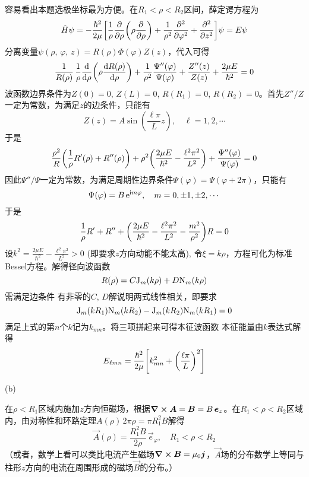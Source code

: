 \begin{enumerate}[label=\textbf{5.\Alph*}, listparindent=\parindent, leftmargin=-0.5mm]
容易看出本题选极坐标最为方便。在$R_1<\rho<R_2$区间，薛定谔方程为
\[\hat{H}\psi = -\frac{\hbar^2}{2\mu}\qty[\frac{1}{\rho}\pdv{\rho}\qty(\rho\pdv{\rho})+\frac{1}{\rho^2}\pdv[2]{\varphi}+\pdv[2]{z}]\psi = E\psi\]
分离变量$\psi(\rho,\,\varphi,\,z)=R(\rho)\Phi(\varphi)Z(z)$，代入可得
\[\frac{1}{R(\rho)}\,\frac{1}{\rho}\dv{\rho}\qty(\rho\dv{R(\rho)}{\rho})+\frac{1}{\rho^2}\frac{\Psi''(\varphi)}{\Psi(\varphi)}+\frac{Z''(z)}{Z(z)} + \frac{2\mu E}{\hbar^2}=0\]
波函数边界条件为$Z(0)=0$, $Z(L)=0$, $R(R_1)=0$, $R(R_2)=0$。首先$Z''/Z$一定为常数，为满足$z$的边条件，只能有
\[Z(z)=A\sin(\frac{\ell \pi}{L}z),\quad \ell=1,2,\cdots\]
于是
\[\frac{\rho^2}{R}\qty(\frac{1}{\rho} R'(\rho)+R''(\rho))+\rho^2\qty(\frac{2\mu E}{\hbar^2}-\frac{\ell^2 \pi^2}{L^2})+\frac{\Psi''(\varphi)}{\Psi(\varphi)}=0\]
因此$\Psi''/\Psi$一定为常数，为满足周期性边界条件$\Psi(\varphi)=\Psi(\varphi+2\pi)$，只能有
\[\Psi(\varphi)=B\,\mathrm{e}^{\mathrm{i} m\varphi},\quad m=0,\pm1,\pm2,\cdots\]
于是
\begin{equation}\label{eq:1}
    \frac{1}{\rho}R'+R''+\qty(\frac{2\mu E}{\hbar^2}-\frac{\ell^2\pi^2}{L^2}-\frac{m^2}{\rho^2})R=0
\end{equation}
设$k^2 = \frac{2\mu E}{\hbar^2}-\frac{\ell^2\pi^2}{L^2}>0$ (即要求$z$方向动能不能太高), 令$\xi =k\rho$，方程可化为标准Bessel方程。解得径向波函数
\[R(\rho)=C\mathrm{J}_m(k\rho) + D\mathrm{N}_m(k\rho)\]
需满足边条件
有非零的$C,\,D$解说明两式线性相关，即要求
\[\mathrm{J}_m(kR_1)\mathrm{N}_m(kR_2)-\mathrm{J}_m(kR_2)\mathrm{N}_m(kR_1)=0\]
满足上式的第$n$个$k$记为$k_{mn}$。将三项拼起来可得本征波函数
本征能量由$k$表达式解得
\[E_{\ell mn} =\frac{\hbar^2}{2\mu}\qty[k_{mn}^2+\qty(\frac{\ell\pi}{L})^2]\]

\noindent (b)

在$\rho<R_1$区域内施加$z$方向恒磁场，根据$\curl{\boldsymbol{A}}=\boldsymbol{B}=B\,\boldsymbol{e}_z$。在$R_1<\rho<R_2$区域内，由对称性和环路定理$A(\rho)\,2\pi\rho = \pi R_1^2 B$解得
\[\vec{A}(\rho)=\frac{R_1^2B}{2\rho}\,\vec{e}_\varphi,\quad R_1<\rho<R_2\]
（或者，数学上看可以类比电流产生磁场$\curl{\boldsymbol{B}}=\mu_0 \boldsymbol{j}$，$\vec{A}$场的分布数学上等同与柱形$z$方向的电流在周围形成的磁场$\vec{B}$的分布。）


\end{enumerate}

